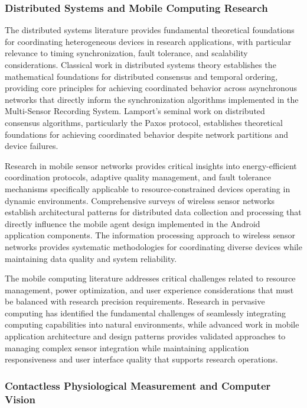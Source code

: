 \documentclass[11pt,a4paper]{article}
\begin{document}
\subsubsection{Distributed Systems and Mobile Computing Research}

The distributed systems literature provides fundamental theoretical foundations for coordinating heterogeneous devices
in research applications, with particular relevance to timing synchronization, fault tolerance, and scalability
considerations. Classical work in distributed systems theory establishes the mathematical foundations for distributed
consensus and temporal ordering, providing core principles for achieving coordinated behavior across asynchronous
networks that directly inform the synchronization algorithms implemented in the Multi-Sensor Recording System. Lamport's
seminal work on distributed consensus algorithms, particularly the Paxos protocol, establishes theoretical foundations
for achieving coordinated behavior despite network partitions and device failures.

Research in mobile sensor networks provides critical insights into energy-efficient coordination protocols, adaptive
quality management, and fault tolerance mechanisms specifically applicable to resource-constrained devices operating in
dynamic environments. Comprehensive surveys of wireless sensor networks establish architectural patterns for distributed
data collection and processing that directly influence the mobile agent design implemented in the Android application
components. The information processing approach to wireless sensor networks provides systematic methodologies for
coordinating diverse devices while maintaining data quality and system reliability.

The mobile computing literature addresses critical challenges related to resource management, power optimization, and
user experience considerations that must be balanced with research precision requirements. Research in pervasive
computing has identified the fundamental challenges of seamlessly integrating computing capabilities into natural
environments, while advanced work in mobile application architecture and design patterns provides validated approaches
to managing complex sensor integration while maintaining application responsiveness and user interface quality that
supports research operations.

\subsubsection{Contactless Physiological Measurement and Computer Vision}
\end{document}
